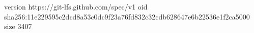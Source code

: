 version https://git-lfs.github.com/spec/v1
oid sha256:11e229595c2dcd8a53c0dc9f23a76fd832c32cdb628647e6b22536e1f2ca5000
size 3407
